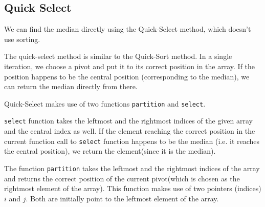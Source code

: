 \subsection{Quick Select}
We can find the median directly using the Quick-Select method, which doesn't use sorting.

The quick-select method is similar to the Quick-Sort method. In a single iteration, we choose a pivot and put it to its correct position in the array. If the position happens to be the central position (corresponding to the median), we can return the median directly from there. 

Quick-Select makes use of two functions \lstinline[language=C++, basicstyle=\small\ttfamily, keywordstyle=\bfseries\color{green!40!black}]|partition| and \lstinline[language=C++, basicstyle=\small\ttfamily, keywordstyle=\bfseries\color{green!40!black}]|select|. 

\lstinline[language=C++, basicstyle=\small\ttfamily, keywordstyle=\bfseries\color{green!40!black}]|select| function takes the leftmost and the rightmost indices of the given array and the central index as well. If the element reaching the correct position in the current function call to \lstinline[language=C++, basicstyle=\small\ttfamily, keywordstyle=\bfseries\color{green!40!black}]|select| function happens to be the median (i.e. it reaches the central position), we return the element(since it is the median). 

The function \lstinline[language=C++, basicstyle=\small\ttfamily, keywordstyle=\bfseries\color{green!40!black}]|partition| takes the leftmost and the rightmost indices of the array and returns the correct position of the current pivot(which is chosen as the rightmost element of the array). This function makes use of two pointers (indices) $i$ and $j$. Both are initially point to the leftmost element of the array.

